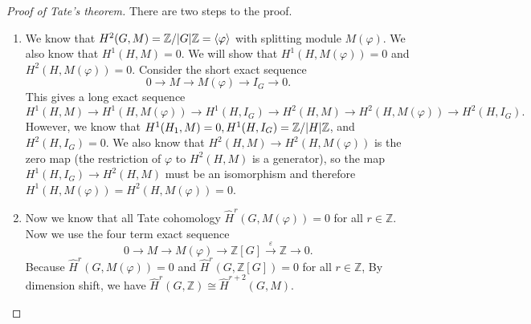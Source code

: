 \documentclass[leqno, openany]{memoir}
\theoremstyle{definition}
\theoremstyle{remark}
\theoremstyle{plain}
\theoremstyle{definition}
\theoremstyle{remark}
\newcommand{\Z}{\mathbb{Z}}
\newcommand{\ep}{\varepsilon}
\newcommand{\wh}[1]{\widehat{#1}}
\begin{document}
\begin{proof}[Proof of Tate's theorem] There are two steps to the proof.
    \begin{enumerate} \item We know that $H^2(G, M) = \Z/\abs{G}\Z =
        \ev{\varphi}$ with splitting module $M(\varphi)$. We also know that
        $H^1(H, M) = 0$. We will show that $H^1(H, M(\varphi)) = 0$ and $H^2(H,
        M(\varphi)) = 0$. Consider the short exact sequence \[ 0 \to M \to
            M(\varphi) \to I_G \to 0. \] This gives a long exact sequence \[
        H^1(H, M) \to H^1(H, M(\varphi)) \to H^1(H, I_G) \to H^2(H, M) \to
    H^2(H, M(\varphi)) \to H^2(H, I_G). \] However, we know that $H^1(H_1, M) =
    0, H^1(H, I_G) = \Z/\abs{H} \Z$, and $H^2(H, I_G) = 0$. We also know that
    $H^2(H, M) \to H^2(H, M(\varphi))$ is the zero map (the restriction of
    $\varphi$ to $H^2(H, M)$ is a generator), so the map $H^1(H, I_G) \to
    H^2(H, M)$ must be an isomorphism and therefore $H^1(H, M(\varphi)) =
    H^2(H, M(\varphi)) = 0$.  \item Now we know that all Tate cohomology
    $\wh{H}^r(G, M(\varphi)) = 0$ for all $r \in \Z$. Now we use the four term
    exact sequence \[ 0 \to M \to M(\varphi) \to \Z[G] \xrightarrow{\ep} \Z \to
    0. \] Because $\wh{H}^r(G, M(\varphi)) = 0$ and $\wh{H}^r(G, \Z[G]) = 0$
    for all $r \in \Z$, By dimension shift, we have $\wh{H}^r(G, \Z) \cong
    \wh{H}^{r+2}(G, M)$. \qedhere \end{enumerate} \end{proof}
\end{document}
